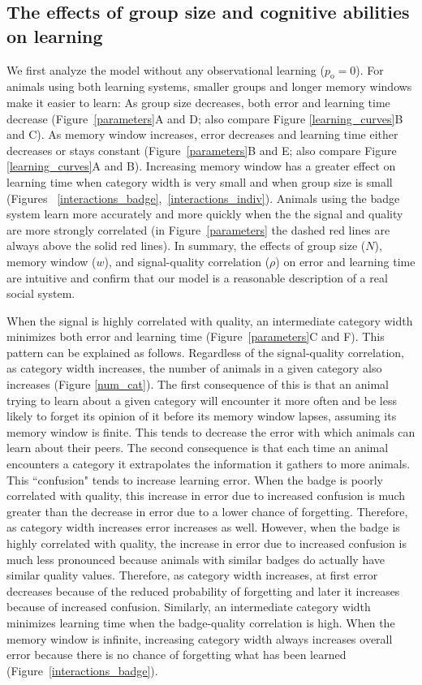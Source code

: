\subsection*{The effects of group size and cognitive abilities on learning }
We first analyze the model without any observational learning ($p_\text{o}=0$).  
For animals using both learning systems, smaller groups and longer memory windows make it easier to learn: As group size decreases, both error and learning time decrease (Figure~\ref{parameters}A and D; also compare Figure \ref{learning_curves}B and C). As memory window increases, error decreases and learning time either decreases or stays constant (Figure~\ref{parameters}B and E; also compare Figure \ref{learning_curves}A and B). Increasing memory window has a greater effect on learning time when category width is very small and when group size is small (Figures ~\ref{interactions_badge},~\ref{interactions_indiv}). Animals using the badge system learn more accurately and more quickly when the the signal and quality are more strongly correlated (in Figure~\ref{parameters} the dashed red lines are always above the solid red lines). In summary, the effects of group size ($N$), memory window ($w$), and signal-quality correlation ($\rho$) on error and learning time are intuitive and confirm that our model is a reasonable description of a real social system. 
 
When the signal is highly correlated with quality, an intermediate category width minimizes both error and learning time (Figure~\ref{parameters}C and F). This pattern can be explained as follows. Regardless of the signal-quality correlation, as category width increases, the number of animals in a given category also increases (Figure \ref{num_cat}). The first consequence of this is that an animal trying to learn about a given category will encounter it more often and be less likely to forget its opinion of it before its memory window lapses, assuming its memory window is finite. This tends to decrease the error with which animals can learn about their peers. The second consequence is that each time an animal encounters a category it extrapolates the information it gathers to more animals. This ``confusion" tends to increase learning error. When the badge is poorly correlated with quality, this increase in error due to increased confusion is much greater than the decrease in error due to a lower chance of forgetting. Therefore, as category width increases error increases as well. However, when the badge is highly correlated with quality, the increase in error due to increased confusion is much less pronounced because animals with similar badges do actually have similar quality values. Therefore, as category width increases, at first error decreases because of the reduced probability of forgetting and later it increases because of increased confusion. Similarly, an intermediate category width minimizes learning time when the badge-quality correlation is high. When the memory window is infinite, increasing category width always increases overall error because there is no chance of forgetting what has been learned (Figure~\ref{interactions_badge}).


